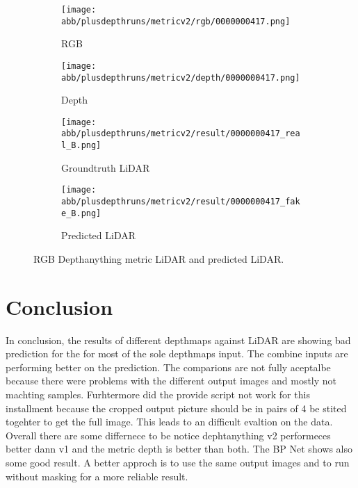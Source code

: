 \begin{figure}[!ht]
	\centering
	
	\begin{subfigure}{0.4\textwidth}
		\centering
		\texttt{[image: abb/plusdepthruns/metricv2/rgb/0000000417.png]}
		\caption{RGB}
		\label{fig:bild1}
	\end{subfigure}
	
	\vspace{1em} %
	
	\begin{subfigure}{0.4\textwidth}
		\centering
		\texttt{[image: abb/plusdepthruns/metricv2/depth/0000000417.png]}
		\caption{Depth}
		\label{fig:bild2}
	\end{subfigure}
	
	\vspace{1em} %
	
	\begin{subfigure}{0.25\textwidth}
		\centering
		\texttt{[image: abb/plusdepthruns/metricv2/result/0000000417\_real\_B.png]}
		\caption{Groundtruth LiDAR}
		\label{fig:bild3}
	\end{subfigure}
	\begin{subfigure}{0.25\textwidth}
		\centering
		\texttt{[image: abb/plusdepthruns/metricv2/result/0000000417\_fake\_B.png]}
		\caption{Predicted LiDAR}
		\label{fig:bild4}
	\end{subfigure}
	
	\caption{RGB Depthanything metric LiDAR and predicted LiDAR.}
	\label{metric_rgbd}
\end{figure}
\chapter{Conclusion}
In conclusion, the results of different depthmaps against LiDAR are showing bad prediction for the for most of the sole depthmaps input. The combine inputs are performing better on the prediction. The comparions are not fully aceptalbe because there were problems with the different output images and mostly not machting samples. Furhtermore did the provide script not work for this installment because the cropped output picture should be in pairs of 4 be stited togehter to get the full image. This leads to an difficult evaltion on the data. \newline \\Overall there are some differnece to be notice dephtanything v2 performeces better dann v1 and the metric depth is better than both. The BP Net shows also some good result. A better approch is to use the same output images and to run without masking for  a more reliable result.

